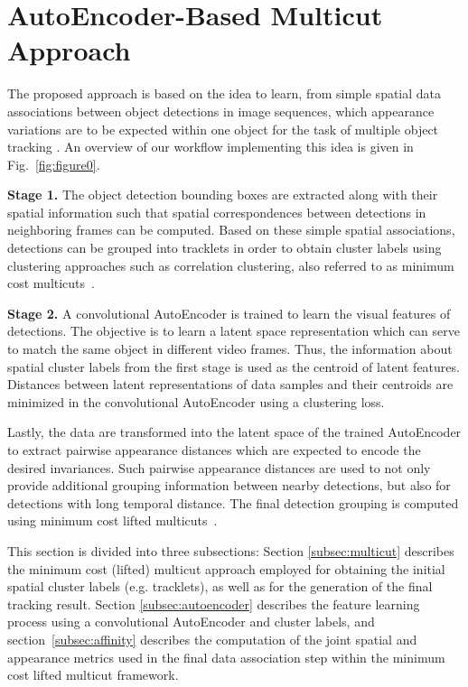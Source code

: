 \section{AutoEncoder-Based Multicut Approach}
\label{subsec:method}
The proposed approach is based on the idea to learn, from simple spatial data associations between object detections in image sequences, which appearance variations are to be expected within one object for the task of multiple object tracking . An overview of our workflow implementing this idea is given in Fig.~\ref{fig:figure0}.

\textbf{Stage 1.} 
The object detection bounding boxes are extracted along with their spatial information such that spatial correspondences between detections in neighboring frames can be computed.
Based on these simple spatial associations, detections can be grouped into tracklets in order to obtain cluster labels using clustering approaches such as correlation clustering, also referred to as minimum cost multicuts~\cite{demaine-2006}.

\textbf{Stage 2.} 
A convolutional AutoEncoder is trained to learn the visual features of detections. 
The objective is to learn a latent space representation which can serve to match the same object in different video frames. 
Thus, the information about spatial cluster labels from the first stage is used as the centroid of latent features. 
Distances between latent representations of data samples and their centroids are minimized in the convolutional AutoEncoder using a clustering loss. 

Lastly, the data are transformed into the latent space of the trained AutoEncoder to extract pairwise appearance distances which are expected to encode the desired invariances. 
Such pairwise appearance distances are used to not only provide additional grouping information between nearby detections, but also for detections with long temporal distance. 
The final detection grouping is computed using minimum cost lifted multicuts~\cite{keupericcv}.

This section is divided into three subsections: 
Section \ref{subsec:multicut} describes the minimum cost (lifted) multicut approach employed for obtaining the initial spatial cluster labels (e.g. tracklets), as well as for the generation of the final tracking result. Section \ref{subsec:autoencoder} describes the feature learning process using a convolutional AutoEncoder and cluster labels, and section~\ref{subsec:affinity} describes the computation of the joint spatial and appearance metrics used in the final data association step within the minimum cost lifted multicut framework.

